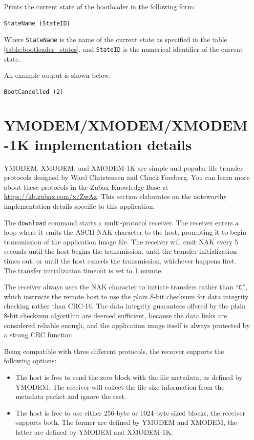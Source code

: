 \documentclass{zubaxdoc}
\begin{document}
Prints the current state of the bootloader in the following form:
\begin{verbatim}
StateName (StateID)
\end{verbatim}
Where \verb|StateName| is the name of the current state as specified in the table \ref{table:bootloader_states},
and \verb|StateID| is the numerical identifier of the current state.

An example output is shown below:
\begin{verbatim}
BootCancelled (2)
\end{verbatim}

\section{YMODEM/XMODEM/XMODEM-1K implementation details}\label{sec:bootloader_ymodem_implementation}

YMODEM, XMODEM, and XMODEM-1K are simple and popular file transfer protocols designed by
Ward Christensen and Chuck Forsberg.
You can learn more about these protocols in the Zubax Knowledge Base at \url{https://kb.zubax.com/x/ZwAz}.
This section elaborates on the noteworthy implementation details specific to this application.

The \verb|download| command starts a multi-protocol receiver.
The receiver enters a loop where it emits the ASCII NAK character to the host,
prompting it to begin transmission of the application image file.
The receiver will emit NAK every 5 seconds until the host begins the transmission,
until the transfer initialization times out,
or until the host cancels the transmission, whichever happens first.
The transfer initialization timeout is set to 1 minute.

The receiver always uses the NAK character to initiate transfers rather than ``\verb|C|'',
which instructs the remote host to use the plain 8-bit checksum for data integrity checking
rather than CRC-16.
The data integrity guarantees offered by the plain 8-bit checksum algorithm are deemed sufficient,
because the data links are considered reliable enough,
and the application image itself is always protected by a strong CRC function.

Being compatible with three different protocols, the receiver supports the following options:
\begin{itemize}
    \item The host is free to send the zero block with the file metadata, as defined by YMODEM.
          The receiver will collect the file size information from the metadata packet and ignore the rest.
    
    \item The host is free to use either 256-byte or 1024-byte sized blocks, the receiver supports both.
          The former are defined by YMODEM and XMODEM, the latter are defined by YMODEM and XMODEM-1K.
\end{itemize}
\end{document}

